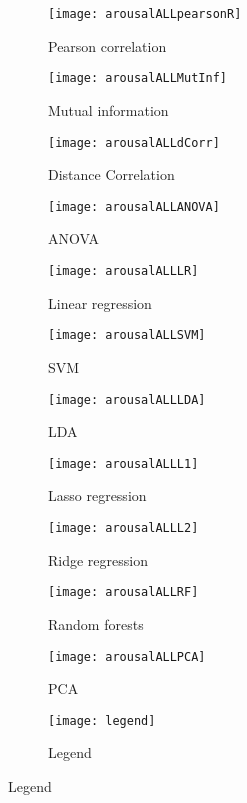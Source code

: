 \clearpage
\begin{figure}[!tbp]
  \centering
  \caption{Selection features for arousal classification.\label{arousalpies}}
  \begin{subfigure}[b]{0.3\textwidth}
    \texttt{[image: arousalALLpearsonR]}
    \caption{Pearson correlation}
  \end{subfigure}
  \hfill
  \begin{subfigure}[b]{0.3\textwidth}
    \texttt{[image: arousalALLMutInf]}
    \caption{Mutual information}
  \end{subfigure}
  \hfill
  \begin{subfigure}[b]{0.3\textwidth}
    \texttt{[image: arousalALLdCorr]}
    \caption{Distance Correlation}
  \end{subfigure}
  
  \begin{subfigure}[b]{0.3\textwidth}
    \texttt{[image: arousalALLANOVA]}
    \caption{ANOVA}
  \end{subfigure}
  \hfill
  \begin{subfigure}[b]{0.3\textwidth}
    \texttt{[image: arousalALLLR]}
    \caption{Linear regression}
  \end{subfigure}
  \hfill
  \begin{subfigure}[b]{0.3\textwidth}
    \texttt{[image: arousalALLSVM]}
    \caption{SVM}
  \end{subfigure}
  
  \begin{subfigure}[b]{0.3\textwidth}
    \texttt{[image: arousalALLLDA]}
    \caption{LDA}
  \end{subfigure}
  \hfill
  \begin{subfigure}[b]{0.3\textwidth}
    \texttt{[image: arousalALLL1]}
    \caption{Lasso regression}
  \end{subfigure}
  \hfill
  \begin{subfigure}[b]{0.3\textwidth}
    \texttt{[image: arousalALLL2]}
    \caption{Ridge regression}
  \end{subfigure}
  
  \begin{subfigure}[b]{0.3\textwidth}
    \texttt{[image: arousalALLRF]}
    \caption{Random forests}
  \end{subfigure}
  \hfill
  \begin{subfigure}[b]{0.3\textwidth}
    \texttt{[image: arousalALLPCA]}
    \caption{PCA}
  \end{subfigure}
  \hfill
  \begin{subfigure}[b]{0.3\textwidth}
    \texttt{[image: legend]}
    \caption{Legend\label{arousalpieslegend}}
  \end{subfigure}
\end{figure}

